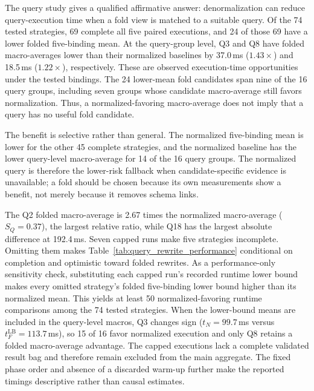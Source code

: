 \documentclass[sigconf]{acmart}
\begin{document}
The query study gives a qualified affirmative answer: denormalization can
reduce query-execution time when a fold view is matched to a suitable query.
Of the 74 tested strategies, 69 complete all five paired executions, and 24 of
those 69 have a lower folded five-binding mean. At the query-group level, Q3
and Q8 have folded macro-averages lower than their normalized baselines by
37.0\,ms ($1.43\times$) and 18.5\,ms ($1.22\times$), respectively. These are
observed execution-time opportunities under the tested bindings. The 24
lower-mean fold candidates span nine of the 16 query groups, including seven
groups whose candidate macro-average still favors normalization. Thus, a
normalized-favoring macro-average does not imply that a query has no useful
fold candidate.

The benefit is selective rather than general. The normalized five-binding mean
is lower for the other 45 complete strategies, and the normalized baseline has
the lower query-level macro-average for 14 of the 16 query groups. The
normalized query is therefore the lower-risk fallback when candidate-specific
evidence is unavailable; a fold should be chosen because its own measurements
show a benefit, not merely because it removes schema links.

The Q2 folded macro-average is 2.67 times the normalized macro-average
($S_Q=0.37$), the largest relative ratio, while Q18 has the largest absolute
difference at 192.4\,ms. Seven capped runs make five strategies
incomplete. Omitting them makes
Table~\ref{tab:query_rewrite_performance} conditional on completion and
optimistic toward folded rewrites. As a performance-only sensitivity check,
substituting each capped run's recorded runtime lower bound makes every omitted
strategy's folded five-binding lower bound higher than its normalized mean.
This yields at least 50 normalized-favoring runtime comparisons among the 74
tested strategies. When the lower-bound means are included in the query-level
macros, Q3 changes sign ($t_N=99.7$\,ms versus
$t_F^{\mathrm{LB}}=113.7$\,ms), so 15 of 16 favor normalized execution and
only Q8 retains a folded macro-average advantage. The capped executions lack a
complete validated result bag and therefore remain excluded from the main
aggregate.
The fixed phase order and absence of a discarded warm-up further make the
reported timings descriptive rather than causal estimates.
\end{document}
